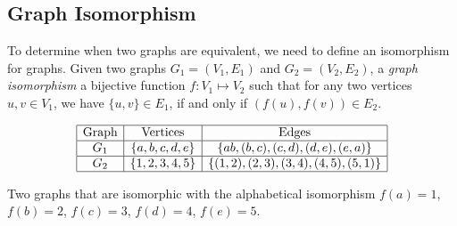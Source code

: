 \subsection{Graph Isomorphism} 
To determine when two graphs are equivalent, we need to define an isomorphism for graphs.  Given 
two graphs $G_1 =(V_1,E_1)$ and $G_2 = (V_2,E_2) $, a \textit{graph isomorphism} a bijective 
function $f: V_1 \mapsto 
V_2$ 
such that for any two vertices $u,v \in V_1$, we have $\{u, v\} \in E_1$, if and 
only 
if $(f(u),f(v)) \in E_2$. 
\begin{table}[!ht]
\begin{center}
$$\begin{array}{|c|c|c|}\hline
\text{Graph}&\text{Vertices}&\text{Edges}\\\hline
G_1&\left\lbrace a,b,c,d,e \right\rbrace & \left\lbrace ab,(b,c),(c,d),(d,e),(e,a) \right\rbrace 
\\\hline
G_2&\left\lbrace 1,2,3,4,5 \right\rbrace & \left\lbrace (1,2),(2,3),(3,4),(4,5),(5,1) \right\rbrace 
\\\hline
\end{array} $$
\caption{Two graphs that are isomorphic with the alphabetical isomorphism $f(a)=1$, $f(b)=2$, $f(c) 
= 3$, $f(d)=4$, $f(e)=5$.}
\end{center} 
\label{table:ch1-graph-1}
\end{table}

